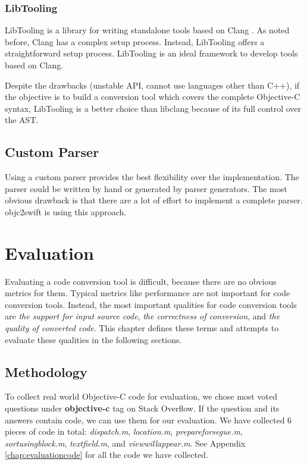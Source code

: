 \documentclass{sfuthesis}
\begin{document}
\subsection{LibTooling}

LibTooling is a library for writing standalone tools based on Clang \cite{libtooling}. As noted before, Clang has a complex setup process. Instead, LibTooling offers a straightforward setup process. LibTooling is an ideal framework to develop tools based on Clang.

Despite the drawbacks (unstable API, cannot use languages other than C++), if the objective is to build a conversion tool which covers the complete Objective-C syntax, LibTooling is a better choice than libclang because of its full control over the AST.

\section{Custom Parser}

Using a custom parser provides the best flexibility over the implementation. The parser could be written by hand or generated by parser generators. The most obvious drawback is that there are a lot of effort to implement a complete parser. objc2swift \cite{objc2swift} is using this approach.

\chapter{Evaluation}

Evaluating a code conversion tool is difficult, because there are no obvious metrics for them. Typical metrics like performance are not important for code conversion tools. Instead, the most important qualities for code conversion tools are \emph{the support for input source code}, \emph{the correctness of conversion}, and \emph{the quality of converted code}. This chapter defines these terms and attempts to evaluate these qualities in the following sections.

\section{Methodology}

To collect real world Objective-C code for evaluation, we chose most voted questions under \textbf{objective-c} tag on Stack Overflow. If the question and its answers contain code, we can use them for our evaluation. We have collected 6 pieces of code in total: \emph{dispatch.m}, \emph{location.m}, \emph{prepareforsegue.m}, \emph{sortusingblock.m}, \emph{textfield.m}, and \emph{viewwillappear.m}. See Appendix \ref{chap:evaluationcode} for all the code we have collected.
\end{document}
